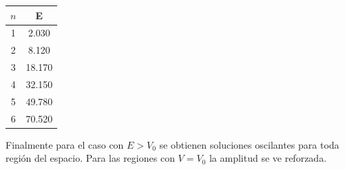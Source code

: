 \documentclass[paper=letter, fontsize=11pt]{scrartcl}
\begin{document}
\begin{table}[h]
	\centering
	\begin{tabular}{cc}
		\hline
		$n$ & E \\
		\hline
		1 & 2.030 \\
		2 & 8.120 \\
		3 & 18.170 \\
		4 & 32.150 \\
		5 & 49.780 \\
		6 & 70.520 \\
		\hline
	\end{tabular}
\end{table}

Finalmente para el caso con $E > V_0$ se obtienen soluciones oscilantes para toda regi\'on del espacio. Para las regiones con $V = V_0$ la amplitud se ve reforzada.
\end{document}
